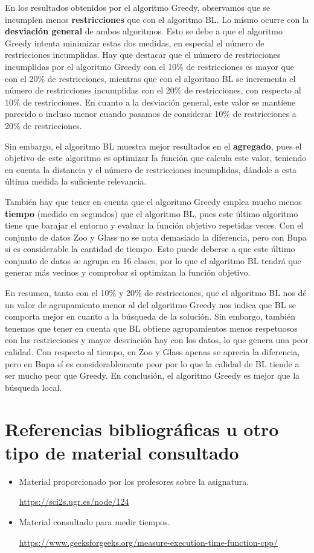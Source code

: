 En los resultados obtenidos por el algoritmo Greedy, observamos que se incumplen menos \textbf{restricciones} que con el algoritmo BL.
Lo mismo ocurre con la \textbf{desviación general} de ambos algoritmos. Esto se debe a que el algoritmo Greedy intenta minimizar estas dos medidas, en especial el número de restricciones incumplidas.
Hay que destacar que el número de restricciones incumplidas por el algoritmo Greedy con el 10\% de restricciones es mayor que con el 20\% de restricciones,
mientras que con el algoritmo BL se incrementa el número de restricciones incumplidas con el 20\% de restricciones, con respecto al 10\% de restricciones.
En cuanto a la desviación general, este valor se mantiene parecido o incluso menor cuando pasamos de considerar 10\% de restricciones a 20\% de restricciones.

Sin embargo, el algoritmo BL muestra mejor resultados en el \textbf{agregado}, pues el objetivo de este algoritmo es optimizar la función que calcula este valor, teniendo 
en cuenta la distancia y el número de restricciones incumplidas, dándole a esta última medida la suficiente relevancia. 

También hay que tener en cuenta que el algoritmo Greedy emplea mucho menos \textbf{tiempo} (medido en segundos) que el algoritmo BL, pues este último algoritmo tiene que barajar el entorno y evaluar la 
función objetivo repetidas veces. Con el conjunto de datos Zoo y Glass no se nota demasiado la diferencia, pero con Bupa si es considerable la cantidad de tiempo. Esto puede deberse 
a que este último conjunto de datos se agrupa en 16 clases, por lo que el algoritmo BL tendrá que generar más vecinos y comprobar si optimizan la función objetivo.

En resumen, tanto con el 10\% y 20\% de restricciones, que el algoritmo BL nos dé un valor de agrupamiento menor al del algoritmo Greedy nos indica que BL se comporta mejor en cuanto 
a la búsqueda de la solución. Sin embargo, también tenemos que tener en cuenta que BL obtiene agrupamientos menos respetuosos con las restricciones y mayor desviación hay con los datos,
lo que genera una peor calidad. Con respecto al tiempo, en Zoo y Glass apenas se aprecia la diferencia, pero en Bupa sí es considerablemente peor por lo que la calidad de BL tiende a ser mucho peor que 
Greedy. En conclusión, el algoritmo Greedy es mejor que la búsqueda local.

\newpage

\section{Referencias bibliográficas u otro tipo de material consultado}

\begin{itemize}
	\item Material proporcionado por los profesores sobre la asignatura.
	
		\url{https://sci2s.ugr.es/node/124}
	\item Material consultado para medir tiempos.
	
		\url{https://www.geeksforgeeks.org/measure-execution-time-function-cpp/}
\end{itemize}